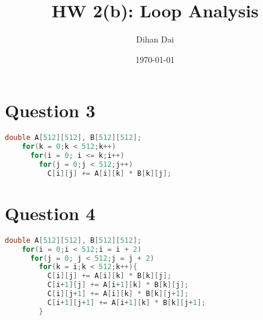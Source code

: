 \documentclass[11pt]{amsart}
\title{HW 2(b): Loop Analysis}
\author{Dihan Dai}
\date{\today}
\begin{document}
\maketitle
\section*{Question 3}
\begin{lstlisting}[language = c]
  double A[512][512], B[512][512];
    for(k = 0;k < 512;k++)
      for(i = 0; i <= k;i++)
        for(j = 0;j < 512;j++)
          C[i][j] += A[i][k] * B[k][j];          
\end{lstlisting}
\section*{Question 4}
\begin{lstlisting}[language = c]
  double A[512][512], B[512][512];
    for(i = 0;i < 512;i = i + 2)
      for(j = 0; j < 512;j = j + 2)
        for(k = i;k < 512;k++){
          C[i][j] += A[i][k] * B[k][j];
          C[i+1][j] += A[i+1][k] * B[k][j];
          C[i][j+1] += A[i][k] * B[k][j+1];
          C[i+1][j+1] += A[i+1][k] * B[k][j+1];    
        }
\end{lstlisting}
\end{document}
